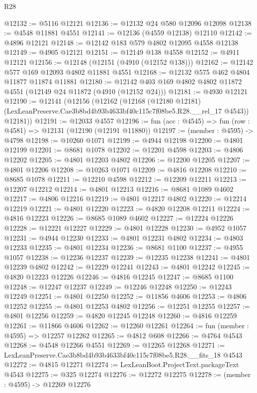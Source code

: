 \begin{lexlean}{R28}
\begin{coremodule}
@12132 := @5116 @12121
@12136 := @12132 @24 @580 @12096 @12098
@12138 := @4548 @11881 @4551
@12141 := @12136 (@4559 @12138) @12110
@12142 := @4896 @12121
@12148 := @12142 @183 @579 @4802 @12095 @4558 @12138
@12149 := @4905 @12121
@12151 := @12149 @138 @4558
@12152 := @4911 @12121
@12156 := @12148 (@12151 (@4910 (@12152 @138)))
@12162 := @12142 @577 @169 @12093 @4802 @11881 @4551
@12168 := @12132 @575 @462 @4804 @11877 @11874 @11881
@12180 := @12142 @403 @169 @4802 @4802 @11872 @4551 (@12149 @24 @11872 (@4910 (@12152 @24)))
@12181 := @4930 @12121
@12190 := @12141
    (@12156
      (@12162
        (@12168
          (@12180 @12181)
          (LexLeanPreserve.Cae3b8bd4b93b4633bf40c115c7f08be5.R28.__rel_17 @4543))
        @12181))
@12191 := @12033 @4557
@12196 := fun (acc : @4545) => fun (row : @4581) => @12131 (@12190 (@12191 @11880))
@12197 := (member : @4595) -> @4798
@12198 := @10260 @1071
@12199 := @4944 @12198
@12200 := @4801 @12199
@12201 := @8681 @1078
@12202 := @12201 @4598
@12203 := @4806 @12202
@12205 := @4801 @12203 @4802
@12206 := @12200 @12205
@12207 := @4801 @12206
@12208 := @10263 @1071
@12209 := @4816 @12208
@12210 := @8685 @1078
@12211 := @12210 @4598
@12212 := @12209 @12211
@12213 := @12207 @12212
@12214 := @4801 @12213
@12216 := @8681 @1089 @4602
@12217 := @4806 @12216
@12219 := @4801 @12217 @4802
@12220 := @12214 @12219
@12221 := @4801 @12220
@12223 := @4820 @12208 @12211
@12224 := @4816 @12223
@12226 := @8685 @1089 @4602
@12227 := @12224 @12226
@12228 := @12221 @12227
@12229 := @4801 @12228
@12230 := @4952 @1057
@12231 := @4944 @12230
@12233 := @4801 @12231 @4802
@12234 := @4803 @12233
@12235 := @4801 @12234
@12236 := @8681 @1100
@12237 := @4955 @1057
@12238 := @12236 @12237
@12239 := @12235 @12238
@12241 := @4801 @12239 @4802
@12242 := @12229 @12241
@12243 := @4801 @12242
@12245 := @4820 @12223 @12226
@12246 := @4816 @12245
@12247 := @8685 @1100
@12248 := @12247 @12237
@12249 := @12246 @12248
@12250 := @12243 @12249
@12251 := @4801 @12250
@12252 := @11856 @4606
@12253 := @4806 @12252
@12255 := @4801 @12253 @4802
@12256 := @12251 @12255
@12257 := @4801 @12256
@12259 := @4820 @12245 @12248
@12260 := @4816 @12259
@12261 := @11866 @4606
@12262 := @12260 @12261
@12264 := fun (member : @4595) => @12257 @12262
@12265 := @4812 @608
@12266 := @4764 @4543
@12268 := @4548 @12266 @4551
@12269 := @12265 @12268
@12271 := LexLeanPreserve.Cae3b8bd4b93b4633bf40c115c7f08be5.R28.__fits_18 @4543
@12272 := @4815 @12271
@12274 := LexLeanBoot.ProjectText.packageText @4543
@12275 := @325 @12274
@12276 := @12272 @12275
@12278 := (member : @4595) -> @12269 @12276

\end{coremodule}
\end{lexlean}
